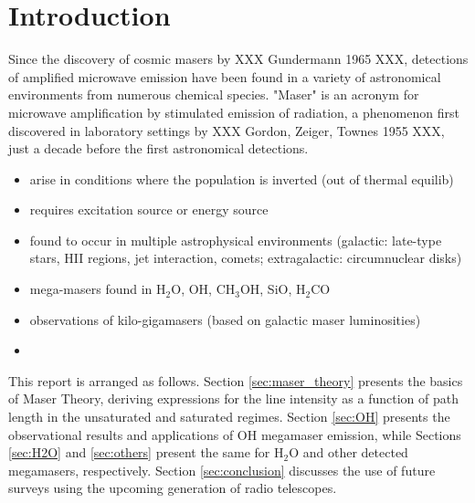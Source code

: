 \section{Introduction}
\label{sec:intro}

Since the discovery of cosmic masers by XXX Gundermann 1965 XXX, detections of amplified microwave emission have been found in a variety of astronomical environments from numerous chemical species. "Maser" is an acronym for microwave amplification by stimulated emission of radiation, a phenomenon first discovered in laboratory settings by XXX Gordon, Zeiger, Townes 1955 XXX, just a decade before the first astronomical detections.



\begin{itemize}
\item arise in conditions where the population is inverted (out of thermal equilib)
\item requires excitation source or energy source
\item found to occur in multiple astrophysical environments (galactic: late-type stars, HII regions, jet interaction, comets; extragalactic: circumnuclear disks)
\item mega-masers found in H$_2$O, OH, CH$_3$OH, SiO, H$_2$CO
\item observations of kilo-gigamasers (based on galactic maser luminosities)
\item 
\end{itemize}

This report is arranged as follows. Section \ref{sec:maser_theory} presents the basics of Maser Theory, deriving expressions for the line intensity as a function of path length in the unsaturated and saturated regimes. Section \ref{sec:OH} presents the observational results and applications of OH megamaser emission, while Sections \ref{sec:H2O} and \ref{sec:others} present the same for H$_2$O and other detected megamasers, respectively. Section \ref{sec:conclusion} discusses the use of future surveys using the upcoming generation of radio telescopes.